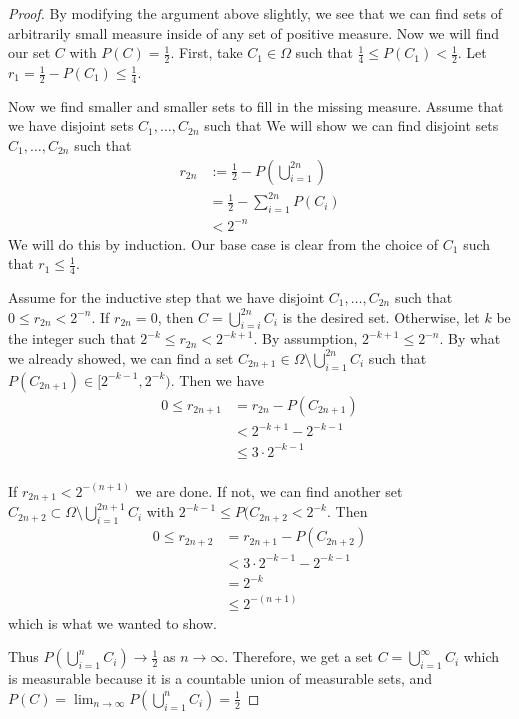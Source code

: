 \documentclass[a4paper]{article}
\begin{document}
\begin{enumerate}
\begin{proof}
        By modifying the argument above slightly, we see that we can find sets of arbitrarily small measure inside of any set of positive measure. Now
        we will find our set $C$ with $P(C) = \frac{1}{2}$. First, take $C_1 \in \Omega$ such that $\frac{1}{4} \leq P(C_1) < \frac{1}{2}$. Let $r_1 =
        \frac{1}{2} - P(C_1) \leq \frac{1}{4}$.

        Now we find smaller and smaller sets to fill in the missing measure. Assume that we have disjoint sets $C_1, \dots, C_{2n}$ such that
        We will show we can find disjoint sets $C_1, \dots, C_{2n}$ such that
        \begin{align*}
          r_{2n} &:= \frac{1}{2} - P \left( \bigcup_{i=1}^{2n} \right) \\
          &= \frac{1}{2} - \sum_{i=1}^{2n} P(C_i) \\
          &< 2^{-n}
        \end{align*}
        We will do this by induction. Our base case is clear from the choice of $C_1$ such that $r_1 \leq \frac{1}{4}$.

        Assume for the inductive step that we have disjoint $C_1, \dots, C_{2n}$ such that
        $0 \leq r_{2n} < 2^{-n}$. If $r_{2n} = 0$, then $C = \bigcup_{i = i}^{2n} C_i$ is the desired set. Otherwise, let $k$ be the
        integer such that $2^{-k} \leq r_{2n} < 2^{-k+1}$. By assumption, $2^{-k+1} \leq 2^{-n}$. By what we already showed, we can find a set $C_{2n+1} \in \Omega
        \setminus \bigcup_{i=1}^{2n} C_i$ such that $P(C_{2n+1}) \in [2^{-k-1}, 2^{-k})$. Then we have
          \begin{align*}
            0 \leq r_{2n+1} &= r_{2n} - P(C_{2n+1}) \\
            &< 2^{-k+1} - 2^{-k-1} \\
            &\leq 3 \cdot 2^{-k-1} \\
          \end{align*}

          If $r_{2n+1} < 2^{-(n+1)}$ we are done. If not, we can find another set $C_{2n+2} \subset \Omega \setminus \bigcup_{i=1}^{2n+1} C_i$ with
          $2^{-k-1} \leq P(C_{2n+2} < 2^{-k}$. Then
          \begin{align*}
            0 \leq r_{2n+2} &= r_{2n+1} - P(C_{2n+2}) \\
            &< 3 \cdot 2^{-k-1} - 2^{-k-1} \\
            &= 2^{-k} \\
            &\leq 2^{-(n+1)}
          \end{align*}
          which is what we wanted to show.

          Thus $P(\bigcup_{i=1}^n C_i) \to \frac{1}{2}$ as $n \to \infty$. Therefore, we get a set $C = \bigcup_{i=1}^\infty C_i$ which is measurable
          because it is a countable union of measurable sets, and $P(C) = \lim_{n \to \infty} P( \bigcup_{i=1}^n C_i ) = \frac{1}{2}$

    \end{proof}

\end{enumerate}
\end{document}
